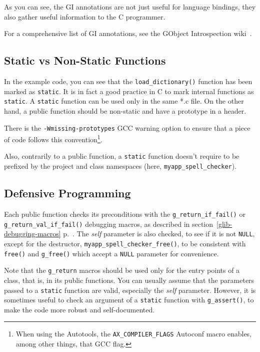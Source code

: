 As you can see, the GI annotations are not just useful for language bindings, they also gather useful information to the C programmer.

For a comprehensive list of GI annotations, see the GObject Introspection wiki~\cite{gobject-introspection}.

\subsection{Static vs Non-Static Functions}
In the example code, you can see that the \lstinline{load_dictionary()} function has been marked as \lstinline{static}. It is in fact a good practice in C to mark internal functions as \lstinline{static}. A \lstinline{static} function can be used only in the same *.c file. On the other hand, a public function should be non-static and have a prototype in a header.

There is the \texttt{-Wmissing-prototypes} GCC warning option to ensure that a piece of code follows this convention\footnote{When using the Autotools, the \texttt{AX\_COMPILER\_FLAGS} Autoconf macro enables, among other things, that GCC flag.}.

Also, contrarily to a public function, a \lstinline{static} function doesn't require to be prefixed by the project and class namespaces (here, \lstinline{myapp_spell_checker}).

\subsection{Defensive Programming}
Each public function checks its preconditions with the \lstinline{g_return_if_fail()} or \lstinline{g_return_val_if_fail()} debugging macros, as described in section~\ref{glib-debugging-macros} p.~\pageref{glib-debugging-macros}. The \emph{self} parameter is also checked, to see if it is not \lstinline{NULL}, except for the destructor, \lstinline{myapp_spell_checker_free()}, to be consistent with \lstinline{free()} and \lstinline{g_free()} which accept a \lstinline{NULL} parameter for convenience.

Note that the \lstinline{g_return} macros should be used only for the entry points of a class, that is, in its public functions. You can usually assume that the parameters passed to a \lstinline{static} function are valid, especially the \emph{self} parameter. However, it is sometimes useful to check an argument of a \lstinline{static} function with \lstinline{g_assert()}, to make the code more robust and self-documented.

